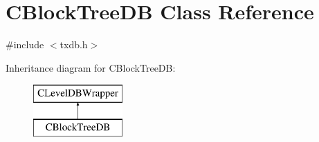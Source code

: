 \hypertarget{class_c_block_tree_d_b}{}\section{C\+Block\+Tree\+D\+B Class Reference}
\label{class_c_block_tree_d_b}


{\ttfamily \#include $<$txdb.\+h$>$}

Inheritance diagram for C\+Block\+Tree\+D\+B\+:\begin{figure}[H]
\begin{center}
\leavevmode
\includegraphics[height=2.000000cm]{class_c_block_tree_d_b}
\end{center}
\end{figure}
